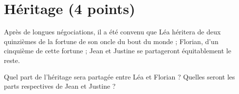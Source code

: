 \section{Héritage (4 points)}

Après de longues négociations, il a été convenu que Léa héritera de deux quinzièmes de la fortune de son oncle du bout du monde ; Florian, d'un cinquième de cette fortune ; Jean et Justine se partageront équitablement le reste.

\begin{questions}
	\question[2] Quel part de l'héritage sera partagée entre Léa et Florian ?
	\question[2] Quelles seront les parts respectives de Jean et Justine ?
\end{questions}

